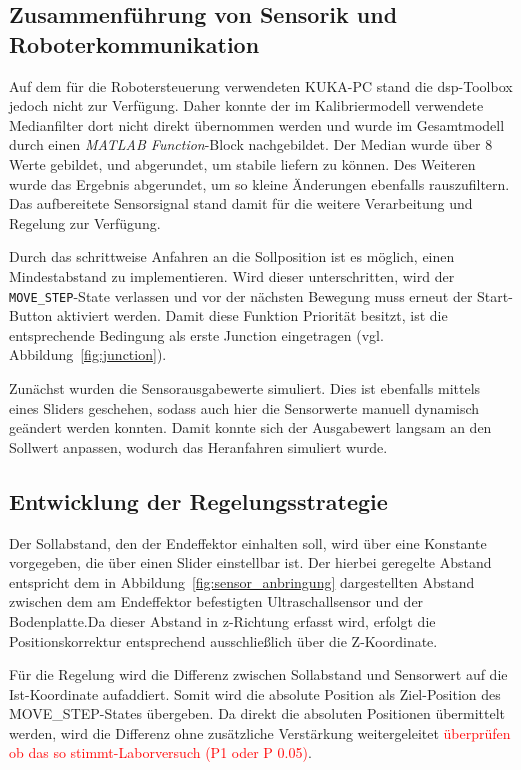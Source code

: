\subsection{Zusammenführung von Sensorik und Roboterkommunikation} \label{sec:regelung}

Auf dem für die Robotersteuerung verwendeten KUKA-PC stand die \ac{dsp}-Toolbox jedoch nicht zur Verfügung. Daher konnte der im Kalibriermodell verwendete Medianfilter dort nicht direkt übernommen werden und wurde im Gesamtmodell durch einen \textit{MATLAB Function}-Block
nachgebildet. Der Median wurde über 8 Werte gebildet, und abgerundet, um stabile liefern zu können. Des Weiteren wurde das Ergebnis abgerundet, um so kleine Änderungen ebenfalls rauszufiltern. Das aufbereitete Sensorsignal stand damit für die weitere Verarbeitung und Regelung zur Verfügung.




Durch das schrittweise Anfahren an die Sollposition ist es möglich, einen Mindestabstand zu implementieren. Wird dieser unterschritten, wird der \texttt{MOVE\_STEP}-State verlassen und vor der nächsten Bewegung muss erneut der Start-Button aktiviert werden. Damit diese Funktion Priorität besitzt, ist die entsprechende Bedingung als erste Junction eingetragen (vgl. Abbildung~\ref{fig:junction}).

Zunächst wurden die Sensorausgabewerte simuliert. Dies ist ebenfalls mittels eines Sliders geschehen, sodass auch hier die Sensorwerte manuell dynamisch geändert werden konnten. Damit konnte sich der Ausgabewert langsam an den Sollwert anpassen, wodurch das Heranfahren simuliert wurde.


\subsection{Entwicklung der Regelungsstrategie} 

Der Sollabstand, den der Endeffektor einhalten soll, wird über eine
Konstante vorgegeben, die über einen Slider einstellbar ist. Der hierbei
geregelte Abstand entspricht dem in
Abbildung~\ref{fig:sensor_anbringung} dargestellten Abstand zwischen dem
am Endeffektor befestigten Ultraschallsensor und der Bodenplatte.Da dieser Abstand in z-Richtung erfasst wird, erfolgt die
Positionskorrektur entsprechend ausschließlich über die Z-Koordinate.

Für die Regelung wird die Differenz zwischen Sollabstand und Sensorwert auf die Ist-Koordinate aufaddiert. Somit wird die absolute Position als Ziel-Position des MOVE\_STEP-States übergeben. Da direkt die absoluten Positionen übermittelt werden, wird die Differenz ohne zusätzliche Verstärkung weitergeleitet \textcolor{red}{überprüfen ob das so stimmt-Laborversuch (P1 oder P 0.05)}.

